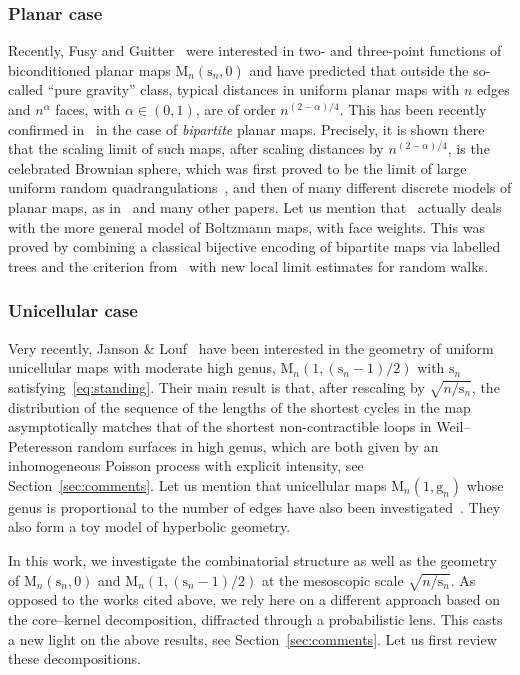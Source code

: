 \documentclass[10pt]{amsart}
\theoremstyle{plain}
\theoremstyle{definition}
\theoremstyle{remark}
\newcommand{\Map}{\mathrm{M}}
\newcommand{\gen}{\mathrm{g}}
\newcommand{\spar}{\mathrm{s}}
\begin{document}
\subsubsection*{Planar case} Recently, Fusy and Guitter~\cite{FG14} were interested in two- and three-point functions of biconditioned planar maps $ \Map_n(\spar_n,0)$ and have predicted that outside the so-called ``pure gravity'' class, typical distances in uniform planar maps with $n$ edges and $n^\alpha$ faces, with $\alpha \in (0,1)$, are of order $n^{(2-\alpha)/4}$. This has been recently confirmed in~\cite{KM21b} in the case of \emph{bipartite} planar maps.
Precisely, it is shown there that the scaling limit of such maps, after scaling distances by $n^{(2- \alpha)/4}$, is the celebrated Brownian sphere, which was first proved to be the limit of large uniform random quadrangulations~\cite{LG13, Mie13}, and then of many different discrete models of planar maps, as in~\cite{ABA21,BJM14,NR18,CLG19,Mar22}
and many other papers. Let us mention that~\cite{KM21b} actually deals with the more general model of Boltzmann maps, with face weights. This was proved by combining a classical bijective encoding of bipartite maps via labelled trees and the criterion from~\cite{Mar22} with new local limit estimates for random walks.

\subsubsection*{Unicellular case} Very recently, Janson \& Louf~\cite{JL21b} have been interested in the geometry of uniform unicellular maps with moderate high genus, \ie $\Map_n(1, (\spar_{n}-1)/2)$ with $\spar_n$ satisfying~\eqref{eq:standing}. Their main result is that, after rescaling by $ \sqrt{n/\spar_n}$, the distribution of the sequence of the lengths of the shortest cycles in the map asymptotically matches that of the shortest non-contractible loops in Weil--Peteresson random surfaces in high genus, which are both given by an inhomogeneous Poisson process with explicit intensity, see Section~\ref{sec:comments}. Let us mention that unicellular maps $ \Map_n(1, \gen_{n})$ whose genus is proportional to the number of edges
have also been investigated~\cite{ACCR13,JL22,Ray15}. They also form a toy model of hyperbolic geometry.

\smallskip
In this work, we investigate the combinatorial structure as well as the geometry of $\Map_n(\spar_{n},0)$ and $\Map_n(1, (\spar_{n}-1)/2)$ at the mesoscopic scale $ \sqrt{n/ \spar_n}$. As opposed to the works cited above, we rely here on a different approach based on the core--kernel decomposition, diffracted through a probabilistic lens. This casts a new light on the above results, see Section~\ref{sec:comments}. Let us first review these decompositions.
\end{document}
